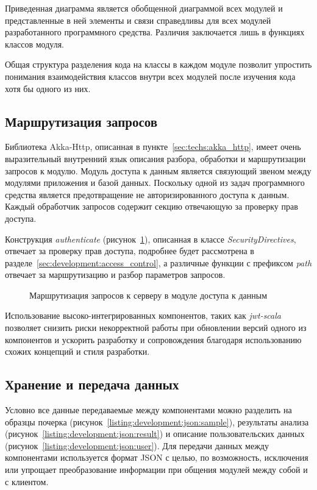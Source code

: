 Приведенная диаграмма является обобщенной диаграммой всех модулей и представленные в ней элементы и связи справедливы для всех модулей разработанного программного средства. Различия заключается лишь в функциях классов модуля.

Общая структура разделения кода на классы в каждом модуле позволит упростить понимания взаимодействия классов внутри всех модулей после изучения кода хотя бы одного из них.

\subsection{Маршрутизация запросов}
Библиотека Akka-Http, описанная в пункте~\ref{sec:techs:akka_http}, имеет очень выразительный внутренний язык описания разбора, обработки и маршрутизации запросов к модулю. Модуль доступа к данным является связующий звеном между модулями приложения и базой данных. Поскольку одной из задач программного средства является предотвращение не авторизированного доступа к данным. Каждый обработчик запросов содержит секцию отвечающую за проверку прав доступа.

Конструкция \emph{authenticate} (рисунок~\ref{listing:development:db_rout}), описанная в классе \emph{SecurityDirectives}, отвечает за проверку прав доступа, подробнее будет рассмотрена в разделе~\ref{sec:development:access_control}, а различные функции с префиксом \emph{path} отвечает за маршрутизацию и разбор параметров запросов. 

\begin{figure}[ht]
    \centering
    
    \caption{Маршрутизация запросов к серверу в модуле доступа к данным}
    \label{listing:development:db_rout}
\end{figure}

Использование высоко-интегрированных компонентов, таких как \emph{jwt-scala} позволяет снизить риски некорректной работы при обновлении версий одного из компонентов и ускорить разработку и сопровождения благодаря использованию схожих концепций и стиля разработки.

\subsection{Хранение и передача данных}

Условно все данные передаваемые между компонентами можно разделить на образцы почерка (рисунок~\ref{listing:development:json:sample}), результаты анализа (рисунок~\ref{listing:development:json:result}) и описание пользовательских данных (рисунок~\ref{listing:development:json:user}). Для передачи данных между компонентами используется формат JSON с целью, по возможность, исключения или упрощает преобразование информации при общения модулей между собой и с клиентом. 

